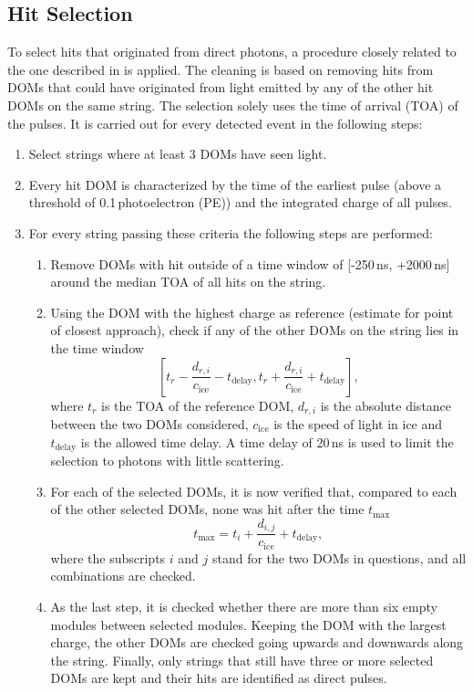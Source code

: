 \subsection{Hit Selection} \label{sec:hit_selection}

To select hits that originated from direct photons, a procedure closely related to the one described in \cite{JPGarza} is applied.
The cleaning is based on removing hits from DOMs that could have originated from light emitted by any of the other hit DOMs on the same string.
The selection solely uses the time of arrival (TOA) of the pulses. It is carried out for every detected event in the following steps:

\begin{enumerate}[label=(\roman*)]
    \item Select strings where at least 3 DOMs have seen light.
    \item Every hit DOM is characterized by the time of the earliest pulse (above a threshold of 0.1\,photoelectron (PE)) and the integrated charge of all pulses.
    \item For every string passing these criteria the following steps are performed:
    \begin{enumerate}[label=(\alph*)]
        \item Remove DOMs with hit outside of a time window of [-250\,ns, +2000\,ns] around the median TOA of all hits on the string.
        \item Using the DOM with the highest charge as reference (estimate for point of closest approach), check if any of the other DOMs on the string lies in the time window
        \begin{equation}
            \left [ t_r - \frac{d_{r,i}}{c_\mathrm{ice}} - t_\mathrm{delay}, t_r + \frac{d_{r,i}}{c_\mathrm{ice}} + t_\mathrm{delay} \right ],
        \end{equation}
        where $t_r$ is the TOA of the reference DOM, $d_{r,i}$ is the absolute distance between the two DOMs considered, $c_\mathrm{ice}$ is the speed of light in ice and $t_\mathrm{delay}$ is the allowed time delay.
        A time delay of 20\,ns is used to limit the selection to photons with little scattering.
        \item For each of the selected DOMs, it is now verified that, compared to each of the other selected DOMs, none was hit after the time $t_\mathrm{max}$
        \begin{equation}
            t_\mathrm{max} = t_i + \frac{d_{i,j}}{c_\mathrm{ice}} + t_\mathrm{delay},
        \end{equation}
        where the subscripts $i$ and $j$ stand for the two DOMs in questions, and all combinations are checked.
        \item As the last step, it is checked whether there are more than six empty modules between selected modules.
        Keeping the DOM with the largest charge, the other DOMs are checked going upwards and downwards along the string.
        Finally, only strings that still have three or more selected DOMs are kept and their hits are identified as direct pulses.
    \end{enumerate}
\end{enumerate}



